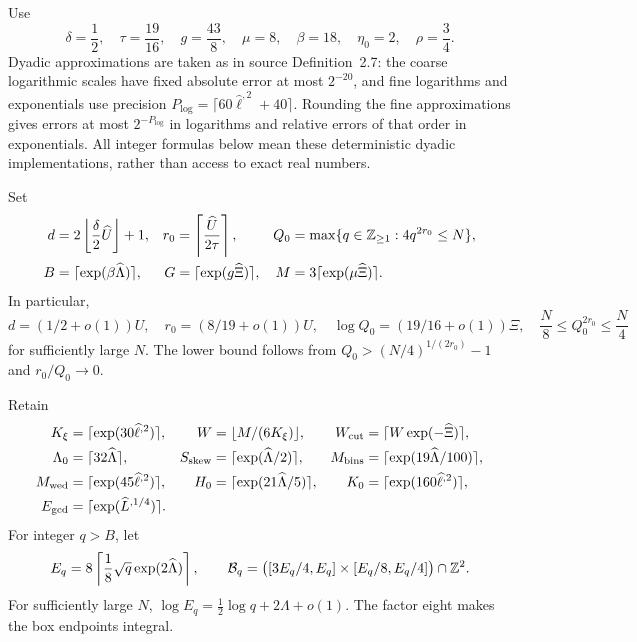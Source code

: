 Use
\begin{equation}
 \delta=\frac12,\quad \tau=\frac{19}{16},\quad
 g=\frac{43}{8},\quad \mu=8,\quad \beta=18,\quad
 \eta_0=2,\quad \rho=\frac34.
 \label{rf:constants}
\end{equation}
Dyadic approximations are taken as in source Definition~2.7:
the coarse logarithmic scales have fixed absolute error at most
$2^{-20}$, and fine logarithms and exponentials use precision
$P_{\log}=\lceil60\widehat\ell^{,2}+40\rceil$.
Rounding the fine approximations gives errors at most
$2^{-P_{\log}}$ in logarithms and relative errors of that order in
exponentials.  All integer formulas below mean these deterministic
dyadic implementations, rather than access to exact real numbers.

Set
\begin{align}
 d&=2\left\lfloor\frac{\delta}{2}\widehat U\right\rfloor+1,
 &r_0&=\left\lceil\frac{\widehat U}{2\tau}\right\rceil,
 &Q_0&=\max\{q\in\mathbb Z_{\ge1}:4q^{2r_0}\le N\},
 \label{rf:dqr}\\
 B&=\lceil\exp(\beta\widehat\Lambda)\rceil,
 &G&=\lceil\exp(g\widehat\Xi)\rceil,
 &M&=3\lceil\exp(\mu\widehat\Xi)\rceil.
 \label{rf:bgm}
\end{align}
In particular,
\begin{equation}
 d=(1/2+o(1))U,\quad
 r_0=(8/19+o(1))U,\quad
 \log Q_0=(19/16+o(1))\Xi,
 \quad \frac N8\le Q_0^{2r_0}\le\frac N4
 \label{rf:rootasymptotics}
\end{equation}
for sufficiently large $N$.  The lower bound follows from
$Q_0>(N/4)^{1/(2r_0)}-1$ and $r_0/Q_0\longrightarrow0$.

Retain
\begin{align*}
 K_\xi&=\lceil\exp(30\widehat\ell^{,2})\rceil,
 &W&=\lfloor M/(6K_\xi)\rfloor,
 &W_{\rm cut}&=\lceil W\exp(-\widehat\Xi)\rceil,\\
 \Lambda_0&=\lceil32\widehat\Lambda\rceil,
 &S_{\rm skew}&=\lceil\exp(\widehat\Lambda/2)\rceil,
 &M_{\rm bins}&=\lceil\exp(19\widehat\Lambda/100)\rceil,\\
 M_{\rm wed}&=\lceil\exp(45\widehat\ell^{,2})\rceil,
 &H_0&=\lceil\exp(21\widehat\Lambda/5)\rceil,
 &K_0&=\lceil\exp(160\widehat\ell^{,2})\rceil,\\
 E_{\rm gcd}&=\lceil\exp(\widehat L^{,1/4})\rceil.
\end{align*}
For integer $q>B$, let
\[
 E_q=8\left\lceil\frac18\sqrt q\exp(2\widehat\Lambda)\right\rceil,
 \qquad
 \mathcal B_q=
 \bigl([3E_q/4,E_q]\times[E_q/8,E_q/4]\bigr)\cap\mathbb Z^2.
\]
For sufficiently large $N$,
$\log E_q=\tfrac12\log q+2\Lambda+o(1)$.
The factor eight makes the box endpoints integral.

